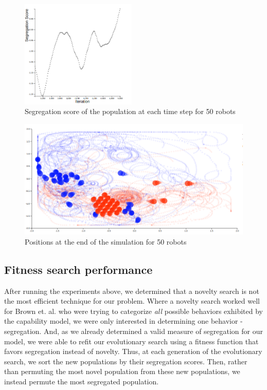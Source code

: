 \begin{figure}
    \centering
    \includegraphics[width=5.5cm]{imgs/final_seg_50.png}
    \caption{Segregation score of the population at each time step for 50 robots}
    \label{fig:final_seg_50}
\end{figure}

\begin{figure}
    \centering
    \includegraphics[width=\linewidth]{imgs/final_place_50.png}
    \caption{Positions at the end of the simulation for 50 robots}
    \label{fig:final_pos_50}
\end{figure}


\subsection{Fitness search performance}
\label{sec:fitness}

After running the experiments above, we determined that a novelty search is not the most efficient technique for our problem. 
Where a novelty search worked well for Brown et. al. who were trying to categorize \emph{all} possible behaviors exhibited by the capability model, we were only interested in determining one behavior - segregation.
And, as we already determined a valid measure of segregation for our model, we were able to refit our evolutionary search using a fitness function that favors segregation instead of novelty. 
Thus, at each generation of the evolutionary search, we sort the new populations by their segregation scores. 
Then, rather than permuting the most novel population from these new populations, we instead permute the most segregated population.

